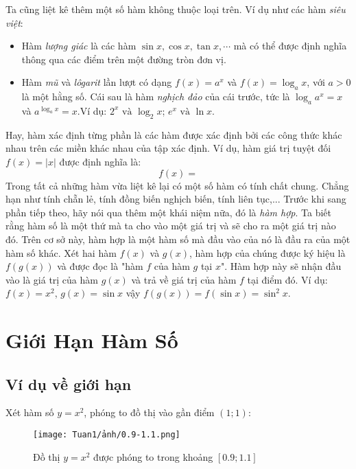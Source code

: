 Ta cũng liệt kê thêm một số hàm không thuộc loại trên.\newline
Ví dụ như các hàm \emph{siêu việt}:\begin{itemize}
    \item Hàm \emph{lượng giác} là các hàm $\sin x,\cos x, \tan x, \cdots$ mà có thể được định nghĩa thông qua các điểm trên một đường tròn đơn vị.
    \item Hàm \emph{mũ} và \emph{lôgarit} lần lượt có dạng $f(x) = a^x$ và $f(x) = \log_a x$, với $a > 0$ là một hằng số. Cái sau là hàm \emph{nghịch đảo} của cái trước, tức là $\log_a a^x = x$ và $a^{\log_a x} = x$.\newline Ví dụ: $2^x \text{ và } \log_2 x$; $e^x \text{ và } \ln x$.
\end{itemize}
Hay, hàm xác định từng phần là các hàm được xác định bởi các công thức khác nhau trên các miền khác nhau của tập xác định.\newline
Ví dụ, hàm giá trị tuyệt đối $f(x) = |x|$ được định nghĩa là:\[
f(x) =\]
Trong tất cả những hàm vừa liệt kê lại có một số hàm có tính chất chung. Chẳng hạn như tính chẵn lẻ, tính đồng biến nghịch biến, tính liên tục,...\newline
Trước khi sang phần tiếp theo, hãy nói qua thêm một khái niệm nữa, đó là \emph{hàm hợp}. Ta biết rằng hàm số là một thứ mà ta cho vào một giá trị và sẽ cho ra một giá trị nào đó. Trên cơ sở này, hàm hợp là một hàm số mà đầu vào của nó là đầu ra của một hàm số khác.\newline
Xét hai hàm $f(x)$ và $g(x)$, hàm hợp của chúng được ký hiệu là $f(g(x))$ và được đọc là "hàm $f$ của hàm $g$ tại $x$". Hàm hợp này sẽ nhận đầu vào là giá trị của hàm $g(x)$ và trả về giá trị của hàm $f$ tại điểm đó.\newline    
Ví dụ: $f(x)=x^2$, $g(x)=\sin x$ vậy $f(g(x))=f(\sin x)=\sin^2 x$.
\section{Giới Hạn Hàm Số}
\subsection{Ví dụ về giới hạn}
Xét hàm số $y=x^2$, phóng to đồ thị vào gần điểm $(1;1)$:
\begin{figure}[h!]
    \centering
    \texttt{[image: Tuan1/ảnh/0.9-1.1.png]}
    \caption{Đồ thị \(y=x^2\) được phóng to trong khoảng $[0.9;1.1]$}
    \label{anh3}
\end{figure}

